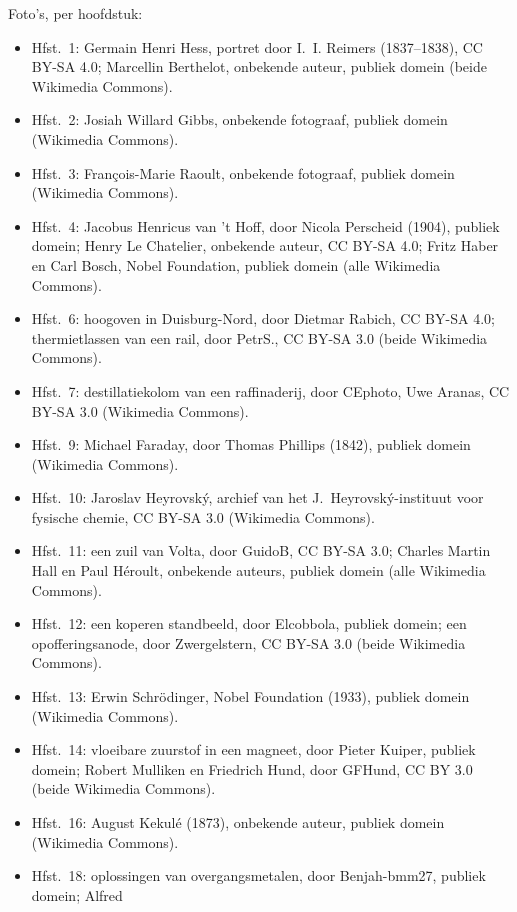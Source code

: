 \bigskip
\noindent Foto's, per hoofdstuk:
\begin{itemize}\small
  \item Hfst.~1: Germain Henri Hess, portret door I.~I. Reimers (1837--1838),
        CC BY-SA 4.0; Marcellin Berthelot, onbekende auteur, publiek domein
        (beide Wikimedia Commons).
  \item Hfst.~2: Josiah Willard Gibbs, onbekende fotograaf, publiek domein
        (Wikimedia Commons).
  \item Hfst.~3: François-Marie Raoult, onbekende fotograaf, publiek domein
        (Wikimedia Commons).
  \item Hfst.~4: Jacobus Henricus van 't Hoff, door Nicola Perscheid (1904),
        publiek domein; Henry Le Chatelier, onbekende auteur, CC BY-SA 4.0;
        Fritz Haber en Carl Bosch, Nobel Foundation, publiek domein (alle
        Wikimedia Commons).
  \item Hfst.~6: hoogoven in Duisburg-Nord, door Dietmar Rabich, CC BY-SA
        4.0; thermietlassen van een rail, door PetrS., CC BY-SA 3.0 (beide
        Wikimedia Commons).
  \item Hfst.~7: destillatiekolom van een raffinaderij, door CEphoto, Uwe Aranas,
        CC BY-SA 3.0 (Wikimedia Commons).
  \item Hfst.~9: Michael Faraday, door Thomas Phillips (1842), publiek domein
        (Wikimedia Commons).
  \item Hfst.~10: Jaroslav Heyrovský, archief van het J.~Heyrovský-instituut
        voor fysische chemie, CC BY-SA 3.0 (Wikimedia Commons).
  \item Hfst.~11: een zuil van Volta, door GuidoB, CC BY-SA 3.0; Charles Martin Hall
        en Paul Héroult, onbekende auteurs, publiek domein (alle Wikimedia
        Commons).
  \item Hfst.~12: een koperen standbeeld, door Elcobbola, publiek domein; een opofferingsanode,
        door Zwergelstern, CC BY-SA 3.0 (beide Wikimedia Commons).
  \item Hfst.~13: Erwin Schrödinger, Nobel Foundation (1933), publiek domein
        (Wikimedia Commons).
  \item Hfst.~14: vloeibare zuurstof in een magneet, door Pieter Kuiper, publiek domein;
        Robert Mulliken en Friedrich Hund, door GFHund, CC BY 3.0 (beide Wikimedia
        Commons).
  \item Hfst.~16: August Kekulé (1873), onbekende auteur, publiek domein
        (Wikimedia Commons).
  \item Hfst.~18: oplossingen van overgangsmetalen, door Benjah-bmm27, publiek domein; Alfred

\end{itemize}
